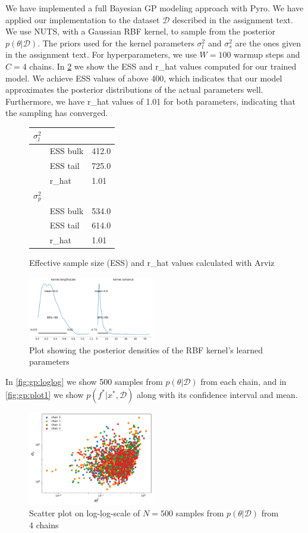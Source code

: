 We have implemented a full Bayesian GP modeling approach with
Pyro. We have applied our implementation to the dataset $\mathcal{D}$ described in the assignment text.
We use NUTS, with a Gaussian RBF kernel, to sample from the posterior $p(\theta | \mathcal{D})$. The priors used for the kernel parameters $\sigma^2_l$ and $\sigma^2_s$ are the ones given in the assignment text.
For hyperparameters, we use $W = 100$ warmup steps and $C = 4$ chains.
In \cref{fig:gp:analysis} we show the ESS and r\_hat values computed for our trained model. We achieve ESS values of above 400, which indicates that our model approximates the posterior distributions of the actual parameters well. Furthermore, we have r\_hat values of 1.01 for both parameters, indicating that the sampling has converged.
\begin{figure}[H]
\begin{tabular}{l l l}
$\sigma^2_l$ & & \\ \midrule
& ESS bulk & 412.0 \\
& ESS tail & 725.0 \\
& r\_hat & 1.01\\ 
$\sigma^2_p$ & & \\\midrule
& ESS bulk & 534.0 \\
& ESS tail & 614.0 \\
& r\_hat & 1.01\\
\end{tabular}
\caption{Effective sample size (ESS) and r\_hat values calculated with Arviz}
\end{figure}
\begin{figure}[H]
    \includegraphics[width=0.49\textwidth]{figures/gp/sample_analysis.pdf}
    \caption{Plot showing the posterior densities of the RBF kernel's learned parameters}
    \label{fig:gp:sample_analysis}
\end{figure}
In \cref{fig:gp:loglog} we show 500 samples from $p(\theta|\mathcal{D})$ from each chain, and in \cref{fig:gp:plot1} we show $p(f^*|x^*, \mathcal{D})$ along with its confidence interval and mean.
\begin{figure}[H]
    \includegraphics[width=0.49\textwidth]{figures/gp/loglogscale.pdf}
    \caption{Scatter plot on log-log-scale of $N = 500$ samples from $p(\theta | \mathcal{D})$ from 4 chains}
    \label{fig:gp:analysis}
\end{figure}
